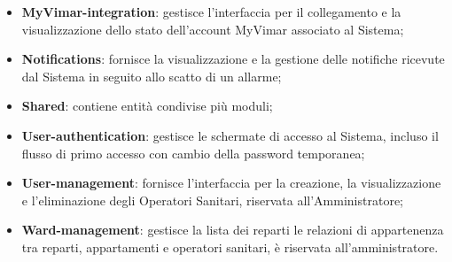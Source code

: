 \documentclass[10pt, letterpaper]{article}
\begin{document}
\begin{itemize}
    includendo il menu di navigazione e il contenitore delle viste;
     \item \textbf{MyVimar-integration}: gestisce l'interfaccia per il collegamento e la 
    visualizzazione dello stato dell'account MyVimar associato al Sistema;
    \item \textbf{Notifications}: fornisce la visualizzazione e la gestione delle notifiche 
    ricevute dal Sistema in seguito allo scatto di un allarme;
    \item \textbf{Shared}: contiene entità condivise più moduli; 
    \item \textbf{User-authentication}: gestisce le schermate di accesso al Sistema, 
    incluso il flusso di primo accesso con cambio della password temporanea;
    \item \textbf{User-management}: fornisce l'interfaccia per la creazione, la 
    visualizzazione e l'eliminazione degli Operatori Sanitari, riservata all'Amministratore;
    \item \textbf{Ward-management}: gestisce la lista dei reparti le relazioni di appartenenza tra reparti,
    appartamenti e operatori sanitari, è riservata all'amministratore.


\end{itemize}


















\end{document}
